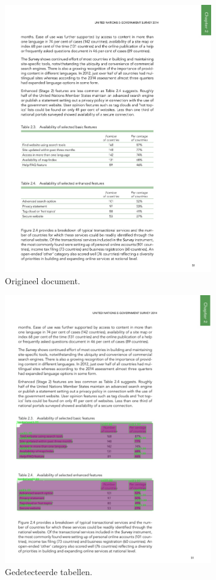 \begin{figure}[H]
    \centering
    \includegraphics[width=0.8\textwidth]{test-resultaten/10/original.jpg}
    \caption{Origineel document.}
\end{figure}

\begin{figure}[H]
    \centering
    \includegraphics[width=0.8\textwidth]{test-resultaten/10/detected_tables.png}
    \caption{Gedetecteerde tabellen.}
\end{figure}


